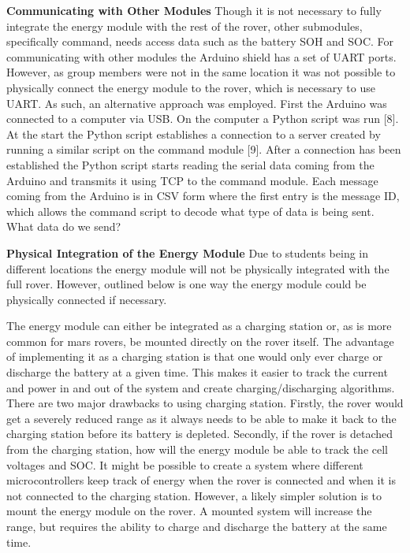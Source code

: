 \documentclass[a4paper]{article}
\begin{document}
\textbf{Communicating with Other Modules}
\vspace{10pt} 
\newline
Though it is not necessary to fully integrate the energy module with the rest of 
the rover, other submodules, specifically command, needs access data such as the 
battery SOH and SOC. For communicating with other modules the Arduino shield has 
a set of UART ports. However, as group members were not in the same location it 
was not possible to physically connect the energy module to the rover, which is 
necessary to use UART. As such, an alternative approach was employed. First the 
Arduino was connected to a computer via USB. On the computer a Python script was 
run [8]. At the start the Python script establishes a connection to a server 
created by running a similar script on the command module [9]. After a 
connection has been established the Python script starts reading the serial data 
coming from the Arduino and transmits it using TCP to the command module. Each 
message coming from the Arduino is in CSV form where the first entry is the 
message ID, which allows the command script to decode what type of data is being 
sent. What data do we send? 

\textbf{Physical Integration of the Energy Module}
\vspace{10pt} 
\newline
Due to students being in different locations the energy module will not be physically 
integrated with the full rover. However, outlined below is one way the energy module 
could be physically connected if necessary. 

The energy module can either be integrated as a charging station or, as is more 
common for mars rovers, be mounted directly on the rover itself. The advantage of 
implementing it as a charging station is that one would only ever charge or discharge 
the battery at a given time. This makes it easier to track the current and power 
in and out of the system and create charging/discharging algorithms. There are 
two major drawbacks to using charging station. Firstly, the rover would get a 
severely reduced range as it always needs to be able to make it back to the 
charging station before its battery is depleted. Secondly, if the rover is detached 
from the charging station, how will the energy module be able to track the cell 
voltages and SOC. It might be possible to create a system where different 
microcontrollers keep track of energy when the rover is connected and when it 
is not connected to the charging station. However, a likely simpler solution 
is to mount the energy module on the rover. A mounted system will increase 
the range, but requires the ability to charge and discharge the battery at the same time.
\end{document}

